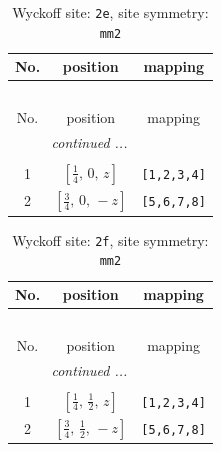 \documentclass[fleqn,8pt]{jsarticle}
\begin{document}
\begin{longtable}{ccc}
\caption{Wyckoff site: {\tt 2e}, site symmetry: {\tt mm2}}
 \\
 \hline \hline
No. & position & mapping \\ \hline \endfirsthead

\multicolumn{2}{l}{\tablename\ \thetable{}} \\
 \hline \hline
No. & position & mapping \\ \hline \endhead

 \hline \hline
\multicolumn{2}{r}{\footnotesize\it continued ...} \\ \endfoot

 \hline \hline
\multicolumn{2}{r}{} \\ \endlastfoot

1 & $\left[ \frac{1}{4},\, 0,\, z \right]$ & {\tt [1,2,3,4]} \\ \hline
2 & $\left[ \frac{3}{4},\, 0,\, - z \right]$ & {\tt [5,6,7,8]} \\
\end{longtable}
\renewcommand{\arraystretch}{1.2}
\begin{longtable}{ccc}
\caption{Wyckoff site: {\tt 2f}, site symmetry: {\tt mm2}}
 \\
 \hline \hline
No. & position & mapping \\ \hline \endfirsthead

\multicolumn{2}{l}{\tablename\ \thetable{}} \\
 \hline \hline
No. & position & mapping \\ \hline \endhead

 \hline \hline
\multicolumn{2}{r}{\footnotesize\it continued ...} \\ \endfoot

 \hline \hline
\multicolumn{2}{r}{} \\ \endlastfoot

1 & $\left[ \frac{1}{4},\, \frac{1}{2},\, z \right]$ & {\tt [1,2,3,4]} \\ \hline
2 & $\left[ \frac{3}{4},\, \frac{1}{2},\, - z \right]$ & {\tt [5,6,7,8]} \\
\end{longtable}
\renewcommand{\arraystretch}{1.2}
\end{document}
